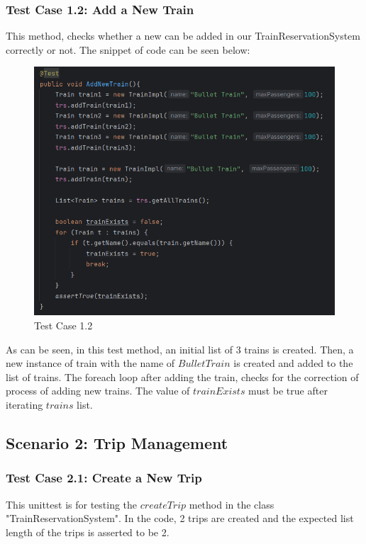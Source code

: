 \documentclass{article}
\begin{document}
\pagebreak

\subsubsection{Test Case 1.2: Add a New Train}
This method, checks whether a new can be added in our TrainReservationSystem correctly or not. The snippet of code can be seen below:

\begin{figure}[h]
  \centering
  \includegraphics[width=1.0\textwidth]{pictures/T1-2.png}
  \caption{Test Case 1.2}
  \label{fig:your_label}
\end{figure}

\bigskip

As can be seen, in this test method, an initial list of 3 trains is created. Then, a new instance of train with the name of $Bullet Train$ is created and added to the list of trains. The foreach loop after adding the train, checks for the correction of process of adding new trains. The value of $trainExists$ must be true after iterating $trains$ list.

\pagebreak

\subsection{Scenario 2: Trip Management}
\subsubsection{Test Case 2.1: Create a New Trip}
This unittest is for testing the $createTrip$ method in the class "TrainReservationSystem". In the code, 2 trips are created and the expected list length of the trips is asserted to be 2.
\end{document}
